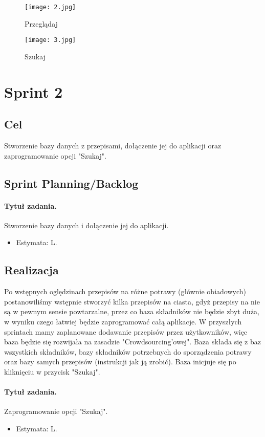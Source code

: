 \documentclass[a4paper]{article}
\begin{document}
	\begin{figure}
		\centering
		\texttt{[image: 2.jpg]}
		\caption{Przeglądaj}
		\label{przegladaj}
	\end{figure}

	\begin{figure}
		\centering
		\texttt{[image: 3.jpg]}
		\caption{Szukaj}
		\label{Szukaj}
	\end{figure}
	
	\section{Sprint 2}
	
	\subsection{Cel} Stworzenie bazy danych z przepisami, dołączenie jej do aplikacji oraz zaprogramowanie opcji "Szukaj".
	
	\subsection{Sprint Planning/Backlog}
	
	\paragraph{Tytuł zadania.} Stworzenie bazy danych i dołączenie jej do aplikacji.
	\begin{itemize}
		\item Estymata: L.
	\end{itemize}
	\subsection{Realizacja}
	Po wstępnych oględzinach przepisów na różne potrawy (głównie obiadowych) postanowiliśmy wstępnie stworzyć kilka przepisów na ciasta, gdyż przepisy na nie są w pewnym sensie powtarzalne, przez co baza składników nie będzie zbyt duża, w wyniku czego łatwiej będzie zaprogramować całą aplikacje. W przyszłych sprintach mamy zaplanowane dodawanie przepisów przez użytkowników, więc baza będzie się rozwijała na zasadzie "Crowdsourcing'owej". Baza składa się z baz wszystkich składników, bazy składników potrzebnych do sporządzenia potrawy oraz bazy samych przepisów (instrukcji jak ją zrobić). Baza inicjuje się po kliknięciu w przycisk "Szukaj".
	
	\paragraph{Tytuł zadania.} Zaprogramowanie opcji "Szukaj".
	\begin{itemize}
		\item Estymata: L.
	\end{itemize}
\end{document}
